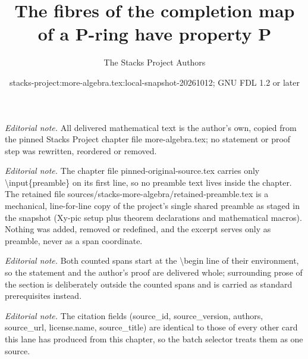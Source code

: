 \documentclass[10pt,a4paper]{amsart}
\title{The fibres of the completion map of a P-ring have property P}
\author{The Stacks Project Authors}
\date{stacks-project:more-algebra.tex:local-snapshot-20261012; GNU FDL 1.2 or later}
\theoremstyle{plain}
\theoremstyle{definition}
\theoremstyle{remark}
\numberwithin{equation}{subsection}
\begin{document}
\maketitle
\setcounter{subsection}{1}
\noindent\textit{Editorial note.} All delivered mathematical text is the author's own, copied from the pinned Stacks Project chapter file more-algebra.tex; no statement or proof step was rewritten, reordered or removed.\par\medskip
\noindent\textit{Editorial note.} The chapter file pinned-original-source.tex carries only \textbackslash{}input\{preamble\} on its first line, so no preamble text lives inside the chapter. The retained file sources/stacks-more-algebra/retained-preamble.tex is a mechanical, line-for-line copy of the project's single shared preamble as staged in the snapshot (Xy-pic setup plus theorem declarations and mathematical macros). Nothing was added, removed or redefined, and the excerpt serves only as preamble, never as a span coordinate.\par\medskip
\noindent\textit{Editorial note.} Both counted spans start at the \textbackslash{}begin line of their environment, so the statement and the author's proof are delivered whole; surrounding prose of the section is deliberately outside the counted spans and is carried as standard prerequisites instead.\par\medskip
\noindent\textit{Editorial note.} The citation fields (source\_id, source\_version, authors, source\_url, license.name, source\_title) are identical to those of every other card this lane has produced from this chapter, so the batch selector treats them as one source.\par\medskip
\end{document}
